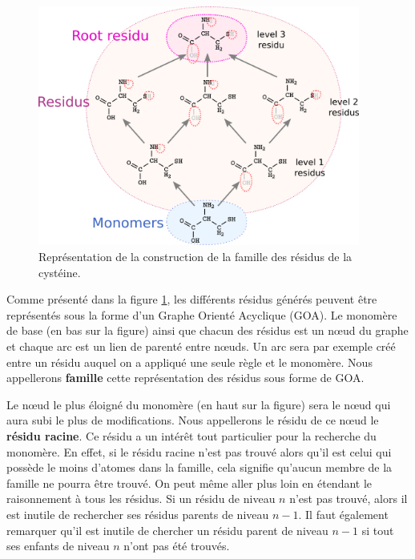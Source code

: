 \begin{figure}[!ht]
  \begin{center}
    \includegraphics[width=400px]{Figures/s2m/residues/cystein_family.png}
    \caption{\label{family}Représentation de la construction de la famille des résidus de la cystéine.}
  \end{center}
\end{figure}

Comme présenté dans la figure \ref{family}, les différents résidus générés peuvent être représentés sous la forme d'un Graphe Orienté Acyclique (GOA).
Le monomère de base (en bas sur la figure) ainsi que chacun des résidus est un n\oe{}ud du graphe et chaque arc est un lien de parenté entre n\oe{}uds.
Un arc sera par exemple créé entre un résidu auquel on a appliqué une seule règle et le monomère.
Nous appellerons \textbf{famille} cette représentation des résidus sous forme de GOA.

Le n\oe{}ud le plus éloigné du monomère (en haut sur la figure) sera le n\oe{}ud qui aura subi le plus de modifications.
Nous appellerons le résidu de ce n\oe{}ud le \textbf{résidu racine}.
Ce résidu a un intérêt tout particulier pour la recherche du monomère.
En effet, si le résidu racine n'est pas trouvé alors qu'il est celui qui possède le moins d'atomes dans la famille, cela signifie qu'aucun membre de la famille ne pourra être trouvé.
On peut même aller plus loin en étendant le raisonnement à tous les résidus.
Si un résidu de niveau $n$ n'est pas trouvé, alors il est inutile de rechercher ses résidus parents de niveau $n-1$.
Il faut également remarquer qu'il est inutile de chercher un résidu parent de niveau $n-1$ si tout ses enfants de niveau $n$ n'ont pas été trouvés.

